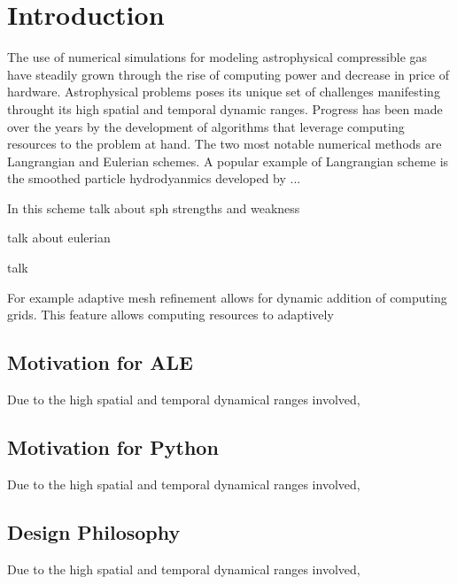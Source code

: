 \section{Introduction}
\label{sec.intro}

The use of numerical simulations for modeling astrophysical compressible 
gas have steadily grown through the rise of computing power and decrease
in price of hardware. Astrophysical problems poses its unique set of challenges
manifesting throught its high spatial and temporal dynamic ranges. Progress
has been made over the years by the development of algorithms that leverage
computing resources to the problem at hand. The two most notable numerical methods 
are Langrangian and Eulerian schemes. A popular example of Langrangian scheme
is the smoothed particle hydrodyanmics developed by ... 

In this scheme
talk  about sph strengths and weakness

talk about eulerian

talk

For example adaptive mesh refinement
allows for dynamic addition of computing grids. This feature allows computing
resources to adaptively  

\subsection{Motivation for ALE}
\label{sec.motivation_ale}

Due to the high spatial and temporal dynamical ranges involved,

\subsection{Motivation for Python}
\label{sec.motivation_python}

Due to the high spatial and temporal dynamical ranges involved,

\subsection{Design Philosophy}
\label{sec.design_philosophy}

Due to the high spatial and temporal dynamical ranges involved,
